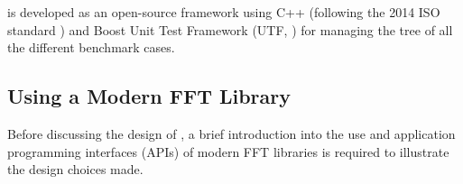 
\gearshifft{} is developed as an open-source framework using C++ (following the 2014 ISO standard \cite{cpp14std}) and Boost Unit Test Framework (UTF, \cite{boost}) for managing the tree of all the different benchmark cases.

\subsection{Using a Modern FFT Library}
\label{ssec:modern_ffts}

Before discussing the design of \gearshifft{}, a brief introduction into the use and application programming interfaces (APIs) of modern FFT libraries is required to illustrate the design choices made.

